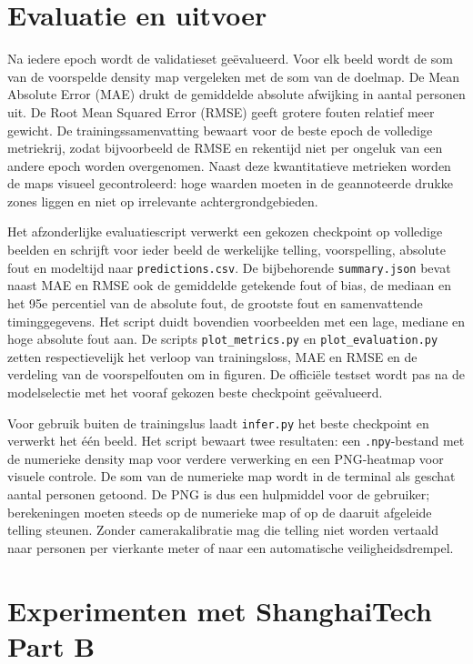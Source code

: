 \section{Evaluatie en uitvoer}

Na iedere epoch wordt de validatieset geëvalueerd. Voor elk beeld wordt de som van de voorspelde density map vergeleken met de som van de doelmap. De Mean Absolute Error (MAE) drukt de gemiddelde absolute afwijking in aantal personen uit. De Root Mean Squared Error (RMSE) geeft grotere fouten relatief meer gewicht. De trainingssamenvatting bewaart voor de beste epoch de volledige metriekrij, zodat bijvoorbeeld de RMSE en rekentijd niet per ongeluk van een andere epoch worden overgenomen. Naast deze kwantitatieve metrieken worden de maps visueel gecontroleerd: hoge waarden moeten in de geannoteerde drukke zones liggen en niet op irrelevante achtergrondgebieden.

Het afzonderlijke evaluatiescript verwerkt een gekozen checkpoint op volledige beelden en schrijft voor ieder beeld de werkelijke telling, voorspelling, absolute fout en modeltijd naar \texttt{predictions.csv}. De bijbehorende \texttt{summary.json} bevat naast MAE en RMSE ook de gemiddelde getekende fout of bias, de mediaan en het 95e percentiel van de absolute fout, de grootste fout en samenvattende timinggegevens. Het script duidt bovendien voorbeelden met een lage, mediane en hoge absolute fout aan. De scripts \texttt{plot\_metrics.py} en \texttt{plot\_evaluation.py} zetten respectievelijk het verloop van trainingsloss, MAE en RMSE en de verdeling van de voorspelfouten om in figuren. De officiële testset wordt pas na de modelselectie met het vooraf gekozen beste checkpoint geëvalueerd.

Voor gebruik buiten de trainingslus laadt \texttt{infer.py} het beste checkpoint en verwerkt het één beeld. Het script bewaart twee resultaten: een \texttt{.npy}-bestand met de numerieke density map voor verdere verwerking en een PNG-heatmap voor visuele controle. De som van de numerieke map wordt in de terminal als geschat aantal personen getoond. De PNG is dus een hulpmiddel voor de gebruiker; berekeningen moeten steeds op de numerieke map of op de daaruit afgeleide telling steunen. Zonder camerakalibratie mag die telling niet worden vertaald naar personen per vierkante meter of naar een automatische veiligheidsdrempel.

\section{Experimenten met ShanghaiTech Part B}

